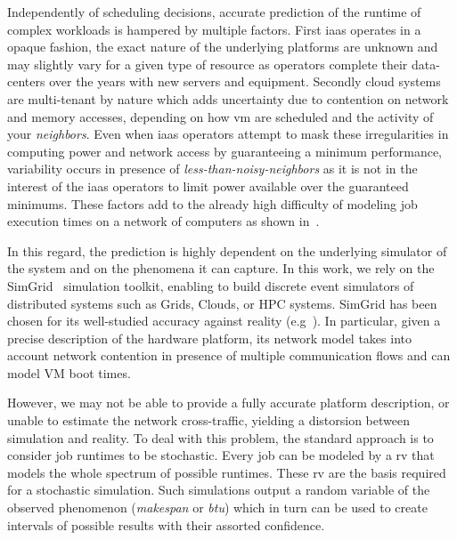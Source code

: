 \documentclass[10pt,conference,compsocconf]{IEEEtran}
\begin{document}
Independently  of scheduling  decisions,  accurate prediction  of  the runtime  of
complex workloads is hampered by  multiple factors.  First \ac{iaas} operates
in a  opaque fashion, the exact  nature of the underlying  platforms are unknown
and may slightly vary  for a given type of resource  as operators complete their
data-centers  over the  years with  new servers  and equipment.   Secondly cloud
systems are multi-tenant  by nature which adds uncertainty due  to contention on
network and  memory accesses,  depending on  how \ac{vm}  are scheduled  and the
activity of  your \emph{neighbors}.   Even when  \ac{iaas} operators  attempt to
mask these irregularities in computing  power and network access by guaranteeing
a    minimum     performance,    variability     occurs    in     presence    of
\emph{less-than-noisy-neighbors} as it  is not in the interest  of the \ac{iaas}
operators to limit power available  over the guaranteed minimums.  These factors
add to the already high difficulty of  modeling job execution times on a network
of computers as shown in~\cite{Lastovetsky05}.

In this regard,  the prediction is highly dependent on  the underlying simulator
of the system and on the phenomena it  can capture. In this work, we rely on the
SimGrid~\cite{simgrid}  simulation toolkit,  enabling  to  build discrete  event
simulators of distributed systems such as Grids, Clouds, or HPC systems. SimGrid
has   been    chosen   for    its   well-studied   accuracy    against   reality
(e.g~\cite{StanisicTLVM15,VelhoSCL13}).   In   particular,   given   a   precise
description  of the  hardware platform,  its  network model  takes into  account
network contention in  presence of multiple communication flows and  can model VM
boot times.

However, we may not be able to provide a fully accurate platform description, or
unable  to estimate  the network  cross-traffic, yielding  a distorsion  between
simulation and reality.  To deal with this problem, the  standard approach is to
consider job runtimes to  be stochastic.  Every job can be  modeled by a \ac{rv}
that models the whole spectrum of possible runtimes. These \ac{rv} are the basis
required for a stochastic simulation.  Such simulations output a random variable
of the  observed phenomenon (\emph{makespan}  or \emph{\ac{btu}}) which  in turn
can  be  used to  create  intervals  of  possible  results with  their  assorted
confidence.
\end{document}
